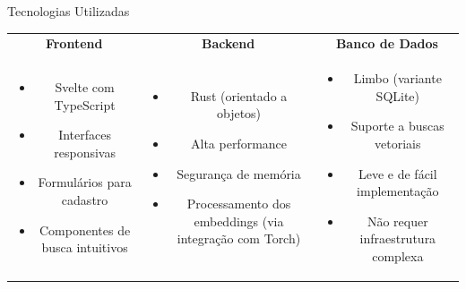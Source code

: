\documentclass{beamer}
\begin{document}
\begin{frame}{Tecnologias Utilizadas}
\begin{tabular}{ccc}
    \textbf{Frontend} & \textbf{Backend} & \textbf{Banco de Dados} \\
    \begin{minipage}{0.3\textwidth}
        \begin{itemize}
            \item Svelte com TypeScript
            \item Interfaces responsivas
            \item Formulários para cadastro
            \item Componentes de busca intuitivos
        \end{itemize}
    \end{minipage} &
    \begin{minipage}{0.3\textwidth}
        \begin{itemize}
            \item Rust (orientado a objetos)
            \item Alta performance
            \item Segurança de memória
            \item Processamento dos embeddings (via integração com Torch)
        \end{itemize}
    \end{minipage} &
    \begin{minipage}{0.3\textwidth}
        \begin{itemize}
            \item Limbo (variante SQLite)
            \item Suporte a buscas vetoriais
            \item Leve e de fácil implementação
            \item Não requer infraestrutura complexa
        \end{itemize}
    \end{minipage} \\
\end{tabular}
\end{frame}
\end{document}

